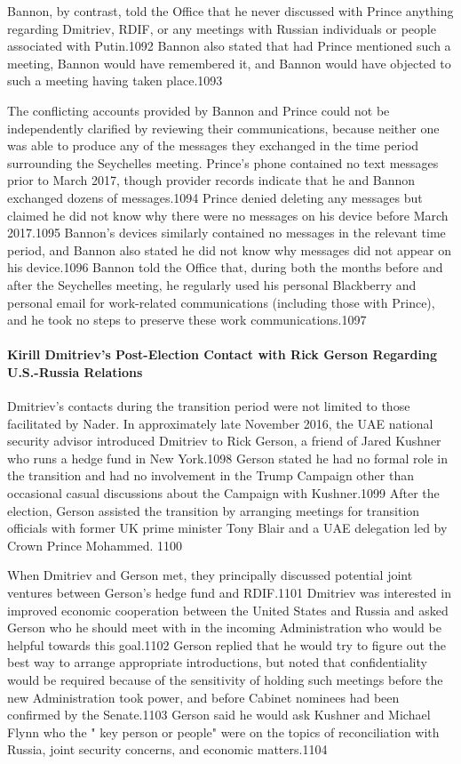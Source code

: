 Bannon, by contrast, told the Office that he never discussed with Prince anything regarding Dmitriev, RDIF,  or any meetings with Russian individuals or people associated with Putin.1092 Bannon also stated that had Prince mentioned such a meeting, Bannon would have remembered it, and Bannon would have objected to such a meeting having taken place.1093

The conflicting accounts provided by Bannon and Prince could not be independently clarified by reviewing their communications, because neither one was able to produce  any of the messages they exchanged in the time period surrounding the Seychelles meeting. Prince's phone contained no text messages prior to March 2017, though provider records indicate that he and Bannon exchanged dozens of messages.1094 Prince denied deleting any messages but claimed he did not know why there were no messages on his device before March 2017.1095 Bannon's devices similarly contained no messages in the relevant time period, and Bannon also stated he did not know why messages did not appear on his device.1096 Bannon told the Office that, during both the months before and after the Seychelles meeting, he regularly used his personal Blackberry and personal email for work-related communications (including those with Prince), and he took no steps to preserve these work communications.1097

\paragraph{Kirill Dmitriev's Post-Election Contact with Rick Gerson Regarding U.S.-Russia Relations}

Dmitriev's contacts during the transition period were not limited to those facilitated by Nader. In approximately late November 2016, the UAE national security advisor introduced Dmitriev to Rick Gerson, a  friend of Jared Kushner who runs a  hedge fund in New York.1098 Gerson stated he had no formal role in the transition and had no involvement in the Trump Campaign other than occasional casual discussions about the Campaign with Kushner.1099 After the election, Gerson assisted the transition by arranging meetings for transition officials with former UK prime minister Tony Blair and a UAE delegation led by Crown Prince Mohammed. 1100

When Dmitriev and Gerson met, they principally discussed potential joint ventures between Gerson's hedge fund and RDIF.1101 Dmitriev was interested in improved economic cooperation between the United States and Russia and asked Gerson who he should meet with in the incoming Administration who would be helpful towards this goal.1102 Gerson replied that he would try to figure out the best way to arrange appropriate introductions, but noted that confidentiality would be required because of the sensitivity of holding such meetings before the new Administration took power, and before Cabinet nominees had been confirmed by the Senate.1103 Gerson said he would ask Kushner and Michael Flynn who the " key person or people" were on the topics of reconciliation with Russia, joint security concerns, and economic matters.1104

